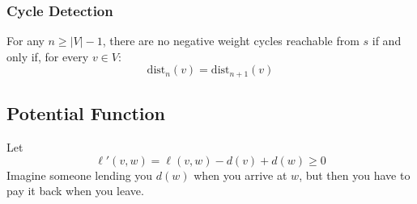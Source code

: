 \documentclass[letterpaper]{article}
\begin{document}
\subsubsection{Cycle Detection}

\begin{proposition}
    For any $n \geq |V| - 1$, there are no negative weight cycles reachable from $s$ if and only if, for every $v \in V$:
    \[\text{dist}_{n}(v) = \text{dist}_{n + 1}(v)\]
\end{proposition}

\subsection{Potential Function}
Let 
\[\ell'(v, w) = \ell(v, w) - d(v) + d(w) \geq 0\]
Imagine someone lending you $d(w)$ when you arrive at $w$, but then you have to pay it back when you leave.
\end{document}
